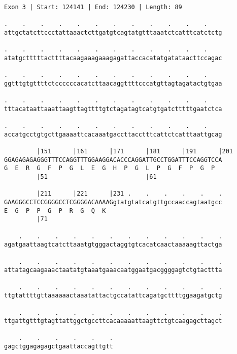 \documentclass{article}
\begin{document}
\newpage
\begin{Verbatim}[fontfamily=courier]
Exon 3 | Start: 124141 | End: 124230 | Length: 89

.    .    .    .    .    .    .    .    .    .    .    .    
attgctatcttccctattaaactcttgatgtcagtatgtttaaatctcatttcatctctg

.    .    .    .    .    .    .    .    .    .    .    .    
atatgctttttacttttacaagaaagaaagagattaccacatatgatataacttccagac

.    .    .    .    .    .    .    .    .    .    .    .    
ggtttgtgttttctccccccacatcttaacaggttttcccatgttagtagatactgtgaa

.    .    .    .    .    .    .    .    .    .    .    .    
tttacataattaaattaagttagttttgtctagatagtcatgtgatctttttgaatctca

.    .    .    .    .    .    .    .    .    .    .    .    
accatgcctgtgcttgaaaattcacaaatgaccttacctttcattctcatttaattgcag

         |151      |161      |171      |181      |191      |201
GGAGAGAGAGGGTTTCCAGGTTTGGAAGGACACCCAGGATTGCCTGGATTTCCAGGTCCA
G  E  R  G  F  P  G  L  E  G  H  P  G  L  P  G  F  P  G  P  
         |51                           |61                  

         |211      |221      |231 .    .    .    .    .    .
GAAGGGCCTCCGGGGCCTCGGGGACAAAAGgtatgtatcatgttgccaaccagtaatgcc
E  G  P  P  G  P  R  G  Q  K                                
         |71                                                

    .    .    .    .    .    .    .    .    .    .    .    .
agatgaattaagtcatcttaaatgtgggactaggtgtcacatcaactaaaaagttactga

    .    .    .    .    .    .    .    .    .    .    .    .
attatagcaagaaactaatatgtaaatgaaacaatggaatgacggggagtctgtacttta

    .    .    .    .    .    .    .    .    .    .    .    .
ttgtattttgttaaaaaactaaatattactgccatattcagatgcttttggaagatgctg

    .    .    .    .    .    .    .    .    .    .    .    .
ttgattgtttgtagttattggctgccttcacaaaaattaagttctgtcaagagcttagct

    .    .    .    .    .    .
gagctggagagagctgaattaccagttgtt
\end{Verbatim}
\newpage
\end{document}
